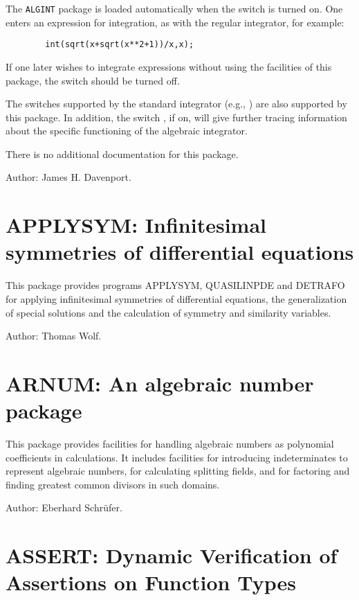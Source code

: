 \hypertarget{switch:ALGINT}{}
The \texttt{ALGINT} package is loaded automatically when the switch 
is turned on.  
One enters an expression for integration, as with the regular integrator,
for example:
\begin{verbatim}
        int(sqrt(x+sqrt(x**2+1))/x,x);
\end{verbatim}
If one later wishes to integrate expressions without using the facilities of
this package, the switch   should be turned
off. 

\hypertarget{switch:TRA}{}
The switches supported by the standard integrator (e.g., )
 are also supported by this package.  In addition, the
switch ,  if on, will give further tracing
information about the specific functioning of the algebraic integrator.

There is no additional documentation for this package.

Author: James H. Davenport.

\section{APPLYSYM: Infinitesimal symmetries of differential equations}

This package provides programs APPLYSYM, QUASILINPDE and DETRAFO for
applying infinitesimal symmetries of differential equations, the
generalization of special solutions and the calculation of symmetry and
similarity variables.

Author: Thomas Wolf.

\section{ARNUM: An algebraic number package} 

This package provides facilities for handling algebraic numbers as
polynomial coefficients in {\REDUCE} calculations. It includes facilities for
introducing indeterminates to represent algebraic numbers, for calculating
splitting fields, and for factoring and finding greatest common divisors
in such domains.

Author: Eberhard Schr\"ufer.

\section{ASSERT: Dynamic Verification of Assertions on Function Types}
\label{ASSERT}

